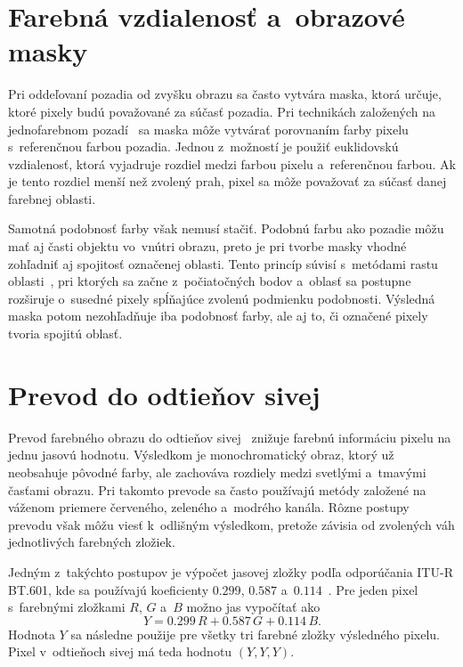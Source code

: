 \section{Farebná vzdialenosť a~obrazové masky}
\label{sec:color_masks}

Pri oddeľovaní pozadia od zvyšku obrazu sa často vytvára maska, ktorá určuje, ktoré pixely budú považované za súčasť pozadia. Pri technikách založených na jednofarebnom pozadí~\cite{afifi} sa maska môže vytvárať porovnaním farby pixelu s~referenčnou farbou pozadia. Jednou z~možností je použiť euklidovskú vzdialenosť, ktorá vyjadruje rozdiel medzi farbou pixelu a~referenčnou farbou. Ak je tento rozdiel menší než zvolený prah, pixel sa môže považovať za súčasť danej farebnej oblasti.

Samotná podobnosť farby však nemusí stačiť. Podobnú farbu ako pozadie môžu mať aj časti objektu vo~vnútri obrazu, preto je pri tvorbe masky vhodné zohľadniť aj spojitosť označenej oblasti. Tento princíp súvisí s~metódami rastu oblasti~\cite{adams}, pri ktorých sa začne z~počiatočných bodov a~oblasť sa postupne rozširuje o~susedné pixely spĺňajúce zvolenú podmienku podobnosti. Výsledná maska potom nezohľadňuje iba podobnosť farby, ale aj to, či označené pixely tvoria spojitú oblasť.

\section{Prevod do odtieňov sivej}
\label{sec:grayscale}

Prevod farebného obrazu do odtieňov sivej~\cite{macedo} znižuje farebnú informáciu pixelu na jednu jasovú hodnotu. Výsledkom je monochromatický obraz, ktorý už neobsahuje pôvodné farby, ale zachováva rozdiely medzi svetlými a~tmavými časťami obrazu. Pri takomto prevode sa často používajú metódy založené na váženom priemere červeného, zeleného a~modrého kanála. Rôzne postupy prevodu však môžu viesť k~odlišným výsledkom, pretože závisia od zvolených váh jednotlivých farebných zložiek.

Jedným z~takýchto postupov je výpočet jasovej zložky podľa odporúčania ITU-R BT.601, kde sa používajú koeficienty \(0.299\), \(0.587\) a~\(0.114\)~\cite{bt601}. Pre jeden pixel s~farebnými zložkami \(R\), \(G\) a~\(B\) možno jas vypočítať ako
\begin{equation}
    Y = 0.299\,R + 0.587\,G + 0.114\,B.
\end{equation}
Hodnota \(Y\) sa následne použije pre všetky tri farebné zložky výsledného pixelu. Pixel v~odtieňoch sivej má teda hodnotu \((Y,Y,Y)\).

